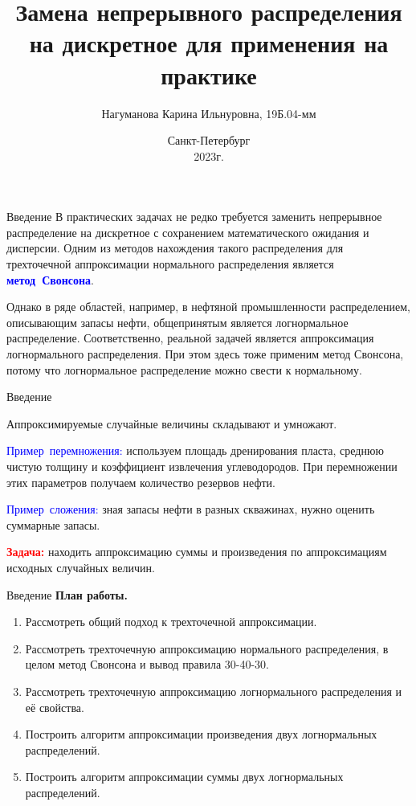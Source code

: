\documentclass[ucs, notheorems, handout]{beamer}
\title[Замена непрерывного распределения]{Замена непрерывного распределения на дискретное для применения на практике}
\author[Нагуманова~К. И.]{ Нагуманова Карина Ильнуровна, 19Б.04-мм}
\date{\tiny{Санкт-Петербург\\ 2023г.}}
\institute[Санкт-Петербургский Государственный Университет]{%
	\small
	Санкт-Петербургский государственный университет\\
	Прикладная математика и информатика\\
	Вычислительная стохастика и статистические модели\\
	\vspace{1.25cm}}
\begin{document}
	
	\begin{frame}
		\titlepage
	\end{frame}

\begin{frame}{Введение}
	В практических задачах не редко требуется заменить непрерывное распределение на
	дискретное с сохранением математического ожидания и дисперсии. Одним из методов
	нахождения такого распределения для трехточечной аппроксимации нормального распределения является \textcolor{blue}{\hbox{\textbf{метод Свонсона}}}.
	
	\bigskip
	
	Однако в ряде областей, например, в нефтяной промышленности распределением, описывающим запасы нефти, общепринятым является логнормальное распределение. 
	Соответственно, реальной задачей является аппроксимация логнормального распределения. При этом здесь тоже применим метод Свонсона, потому что логнормальное распределение можно свести к нормальному.
\end{frame}

\begin{frame}{Введение}
	
	Аппроксимируемые случайные величины складывают и умножают.
	
	\bigskip
	
	\textcolor{blue}{\hbox{Пример перемножения:}} используем площадь дренирования пласта, среднюю чистую толщину и коэффициент извлечения углеводородов. При перемножении этих параметров получаем количество резервов нефти.
	
	\bigskip
	
	\textcolor{blue}{\hbox{Пример сложения:}} зная запасы нефти в разных скважинах, нужно оценить суммарные запасы.
	
	\bigskip
	
	\textcolor{red}{\textbf{Задача:}} находить аппроксимацию суммы и произведения по аппроксимациям исходных случайных величин.
	
\end{frame}

\begin{frame}{Введение}
	\textbf{План работы.}
	\begin{enumerate}
		\item Рассмотреть общий подход к трехточечной аппроксимации.
		\item Рассмотреть трехточечную аппроксимацию нормального распределения, в целом метод Свонсона и вывод правила 30-40-30.
		\item Рассмотреть трехточечную аппроксимацию логнормального распределения и её  свойства.
		\item Построить алгоритм аппроксимации произведения двух логнормальных распределений.
		\item Построить алгоритм аппроксимации суммы двух логнормальных распределений.
	\end{enumerate}
\end{frame}
\end{document}
